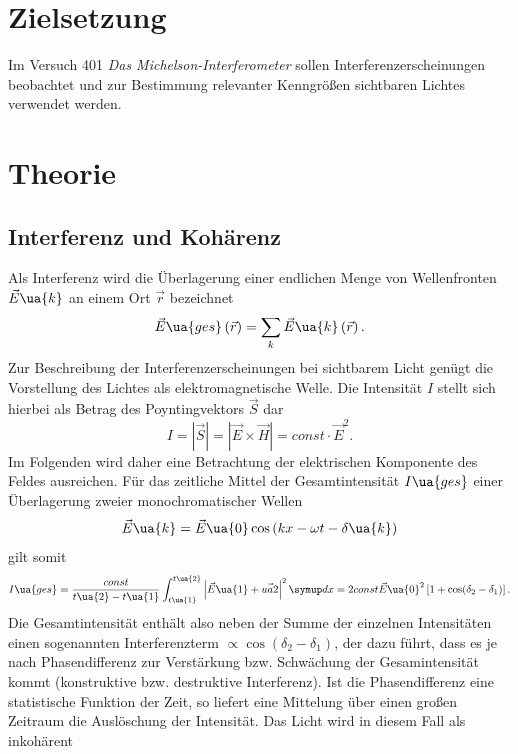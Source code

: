 \setcounter{page}{1}
\section*{Zielsetzung}
Im Versuch 401 \emph{Das Michelson-Interferometer} sollen Interferenzerscheinungen beobachtet und zur Bestimmung
relevanter Kenngrößen sichtbaren Lichtes verwendet werden. %
\section{Theorie}
\subsection{Interferenz und Kohärenz}
Als Interferenz wird die Überlagerung einer endlichen Menge von Wellenfronten $\vec{E}\ua{k}$ an einem Ort $\vec{r}$ bezeichnet
\begin{equation}
  \vec{E}\ua{ges}\left(\vec{r}\right) = \sum_k \vec{E}\ua{k}\left(\vec{r}\right).
\end{equation}
Zur Beschreibung der Interferenzerscheinungen bei sichtbarem Licht genügt die Vorstellung des Lichtes als elektromagnetische
Welle. Die Intensität $I$ stellt sich hierbei als Betrag des Poyntingvektors $\vec{S}$ dar
\begin{equation}
  I = \left|\vec{S}\right| = \left| \vec{E} \times \vec{H}\right| = const \cdot \vec{E}^2.
\end{equation}
Im Folgenden wird daher eine Betrachtung der elektrischen Komponente des Feldes ausreichen.
Für das zeitliche Mittel der Gesamtintensität $I\ua{ges}$ einer Überlagerung zweier monochromatischer Wellen
\begin{equation}
  \vec{E}\ua{k} = \vec{E}\ua{0}\cos\left(kx - \omega t - \delta\ua{k} \right)
\end{equation}
gilt somit
\begin{equation}
  I\ua{ges} = \frac{const}{t\ua{2}- t\ua{1}}\int_{t\ua{1}}^{t\ua{2}}\left| \vec{E}\ua{1} + \vec{ua{2}} \right|^2 \dif{x} = 2const\vec{E}\ua{0}^2\left[1 + \cos(\delta_2- \delta_1)\right].
\end{equation}
Die Gesamtintensität enthält also neben der Summe der einzelnen Intensitäten einen sogenannten Interferenzterm $\propto \cos(\delta_2-\delta_1)$, der dazu führt, dass
es je nach Phasendifferenz zur Verstärkung bzw. Schwächung der Gesamintensität kommt (konstruktive bzw. destruktive Interferenz). Ist die Phasendifferenz eine
statistische Funktion der Zeit, so liefert eine Mittelung über einen großen Zeitraum die Auslöschung der Intensität. Das Licht wird in diesem Fall als inkohärent
